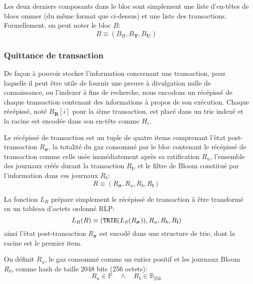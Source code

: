 \documentclass[9pt,oneside]{amsart}
\begin{document}
\begin{multicols}{2}
Les deux derniers composants dans le bloc sont simplement une liste d'en-têtes de blocs ommer (du même format que ci-dessus) et une liste des transactions. Formellement, on peut noter le bloc $B$:
\begin{equation}
B \equiv (B_H, B_\mathbf{T}, B_\mathbf{U})
\end{equation}

\subsubsection{Quittance de transaction}

De façon à pouvoir stocker l'information concernant une transaction, pour laquelle il peut être utile de fournir une preuve à divulgation nulle de connaissance, ou l'indexer à fins de recherche, nous encodons un récépissé de chaque transaction contenant des informations à propos de son exécution. Chaque récépissé, noté $B_\mathbf{R}[i]$ pour la $i$ème transaction, est placé dans un trie indexé et la racine est encodée dans son en-tête comme $H_e$.

Le récépissé de transaction est un tuple de quatre items comprenant l'état post-transaction $R_{\boldsymbol{\sigma}}$, la totalité du gaz consommé par le bloc contenant le récépissé de transaction comme celle usée immédiatement après sa ratification $R_u$, l'ensemble des journaux créés durant la transaction $R_\mathbf{l}$, et le filtre de Bloom constitué par l'information dans ces journaux $R_b$:
\begin{equation}
R \equiv (R_{\boldsymbol{\sigma}}, R_u, R_b, R_\mathbf{l})
\end{equation}

La fonction $L_R$ prépare simplement le récépissé de transaction à être transformé en un tableau d'octets ordonné RLP:
\begin{equation}
L_R(R) \equiv (\mathtt{\small TRIE}(L_S(R_{\boldsymbol{\sigma}})), R_u, R_b, R_\mathbf{l})
\end{equation}
ainsi l'état post-transaction $R_{\boldsymbol{\sigma}}$ est encodé dans une structure de trie, dont la racine est le premier item.

On définit $R_u$, le gaz consommé comme un entier positif et les journaux Bloom $R_b$, comme hash de taille 2048 bits (256 octets):
\begin{equation}
R_u \in \mathbb{P} \quad \wedge \quad R_b \in \mathbb{B}_{256}
\end{equation}



\end{multicols}
\end{document}
